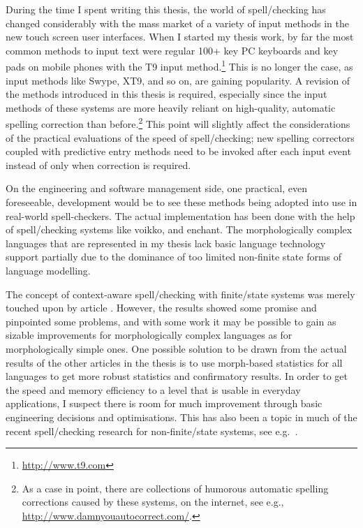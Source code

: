 \documentclass[officiallayout,final]{unihelcompling}
\begin{document}
During the time I spent writing this thesis, the world of spell\-/checking has
changed considerably with the mass market of a variety of input methods in the
new touch screen user interfaces. When I started my thesis work, by far the
most common methods to input text were regular 100+ key PC keyboards and key
pads on mobile phones with the T9 input
method.\footnote{\url{http://www.t9.com}} This is no longer the case, as input
methods like Swype, XT9, and so on, are gaining popularity. A revision of
the methods introduced in this thesis is required, especially since the
input methods of these systems are more heavily reliant on high-quality,
automatic spelling correction than before.\footnote{As a case in point, there
    are collections of humorous automatic spelling corrections caused by these
systems, on the internet, see e.g., \url{http://www.damnyouautocorrect.com/}.}
This point will slightly affect the considerations of the practical evaluations
of the speed of spell\-/checking; new spelling correctors coupled with
predictive entry methods need to be invoked after each input event instead
of only when correction is required.

On the engineering and software management side, one practical, even
foreseeable, development would be to see these methods being adopted into use
in real-world spell-checkers. The actual implementation has been done with the
help of spell\-/checking systems like voikko, and enchant. The morphologically
complex languages that are represented in my thesis lack basic language
technology support partially due to the dominance of too limited non-finite
state forms of language modelling.

The concept of context-aware spell\-/checking with finite\-/state systems was
merely touched upon by article . However, the
results showed some promise and pinpointed some problems, and with some work it
may be possible to gain as sizable improvements for morphologically complex
languages as for morphologically simple ones. One possible solution to be drawn
from the actual results of the other articles in the thesis is to use
morph-based statistics for all languages to get more robust statistics
and confirmatory results. In order to get the speed and memory efficiency to a
level that is usable in everyday applications, I suspect there is room for much
improvement through basic engineering decisions and optimisations. This has
also been a topic in much  of the recent spell\-/checking research for
non-finite\-/state systems, see e.g.~\citet{carlson2001scaling}.
\end{document}
